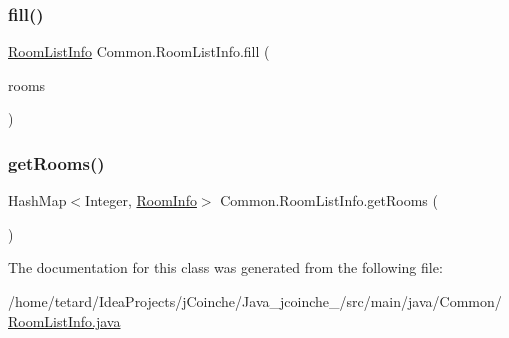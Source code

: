 \subsubsection{\texorpdfstring{fill()}{fill()}}
{\footnotesize\ttfamily \mbox{\hyperlink{classCommon_1_1RoomListInfo}{Room\+List\+Info}} Common.\+Room\+List\+Info.\+fill (\begin{DoxyParamCaption}\item[{Hash\+Map$<$ Integer, \mbox{\hyperlink{classCommon_1_1RoomInfo}{Room\+Info}} $>$}]{rooms }\end{DoxyParamCaption})\hspace{0.3cm}{\ttfamily [inline]}}

\mbox{\label{classCommon_1_1RoomListInfo_a2546f4c16f204de286beae2528c2ea51}} 
\subsubsection{\texorpdfstring{get\+Rooms()}{getRooms()}}
{\footnotesize\ttfamily Hash\+Map$<$Integer, \mbox{\hyperlink{classCommon_1_1RoomInfo}{Room\+Info}}$>$ Common.\+Room\+List\+Info.\+get\+Rooms (\begin{DoxyParamCaption}{ }\end{DoxyParamCaption})\hspace{0.3cm}{\ttfamily [inline]}}



The documentation for this class was generated from the following file\+:\begin{DoxyCompactItemize}
\item 
/home/tetard/\+Idea\+Projects/j\+Coinche/\+Java\+\_\+jcoinche\+\_/src/main/java/\+Common/\mbox{\hyperlink{RoomListInfo_8java}{Room\+List\+Info.\+java}}\end{DoxyCompactItemize}
